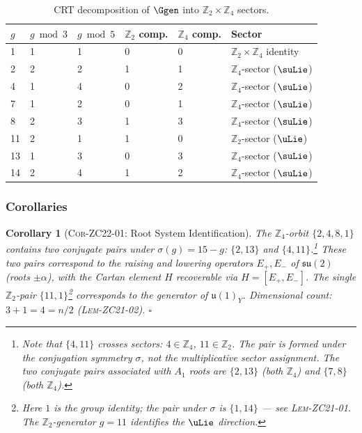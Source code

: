 \documentclass[12pt, a4paper]{article}
\newtheorem{corollary}{Corollary}[section]
\begin{document}
\begin{table}[h]
\centering
\caption{CRT decomposition of $\Ggen$ into $\mathbb{Z}_2 \times \mathbb{Z}_4$ sectors.}
\label{zc22:tab:crt}
{\small
\renewcommand{\arraystretch}{1.30}
\begin{tabular}{@{}p{0.8cm}p{1.4cm}p{1.4cm}p{2.2cm}p{2.2cm}p{3.5cm}@{}}
\toprule
$g$ & $g \bmod 3$ & $g \bmod 5$ &
$\mathbb{Z}_2$ comp. & $\mathbb{Z}_4$ comp. & Sector \\
\midrule
1  & 1 & 1 & 0 & 0 & $\mathbb{Z}_2 \times \mathbb{Z}_4$ identity \\
2  & 2 & 2 & 1 & 1 & $\mathbb{Z}_4$-sector ($\suLie$) \\
4  & 1 & 4 & 0 & 2 & $\mathbb{Z}_4$-sector ($\suLie$) \\
7  & 1 & 2 & 0 & 1 & $\mathbb{Z}_4$-sector ($\suLie$) \\
8  & 2 & 3 & 1 & 3 & $\mathbb{Z}_4$-sector ($\suLie$) \\
11 & 2 & 1 & 1 & 0 & $\mathbb{Z}_2$-sector ($\uLie$) \\
13 & 1 & 3 & 0 & 3 & $\mathbb{Z}_4$-sector ($\suLie$) \\
14 & 2 & 4 & 1 & 2 & $\mathbb{Z}_4$-sector ($\suLie$) \\
\bottomrule
\end{tabular}
}
\end{table}

\subsubsection{Corollaries}

\begin{corollary}[\textsc{Cor-ZC22-01}: Root System Identification]
\label{zc22:cor:roots}
The $\mathbb{Z}_4$-orbit $\{2,4,8,1\}$ contains two conjugate pairs
under $\sigma(g) = 15-g$: $\{2,13\}$ and $\{4,11\}$.\footnote{Note
that $\{4,11\}$ crosses sectors: $4 \in \mathbb{Z}_4$, $11 \in \mathbb{Z}_2$.
The pair is formed under the \emph{conjugation} symmetry $\sigma$,
not the multiplicative sector assignment.
The two conjugate pairs associated with $A_1$ roots are
$\{2,13\}$ (both $\mathbb{Z}_4$) and $\{7,8\}$ (both $\mathbb{Z}_4$).}
These two pairs correspond to the raising and lowering operators
$E_+, E_-$ of $\mathfrak{su}(2)$ (roots $\pm\alpha$),
with the Cartan element $H$ recoverable via $H = [E_+, E_-]$.
The single $\mathbb{Z}_2$-pair $\{11,1\}$\footnote{Here $1$
is the group identity; the pair under $\sigma$ is
$\{1,14\}$ — see \textsc{Lem-ZC21-01}.
The $\mathbb{Z}_2$-generator $g=11$ identifies the $\uLie$ direction.}
corresponds to the generator of $\mathfrak{u}(1)_Y$.
Dimensional count: $3 + 1 = 4 = n/2$ (\textsc{Lem-ZC21-02}).
\hfill$\square$
\end{corollary}
\end{document}
